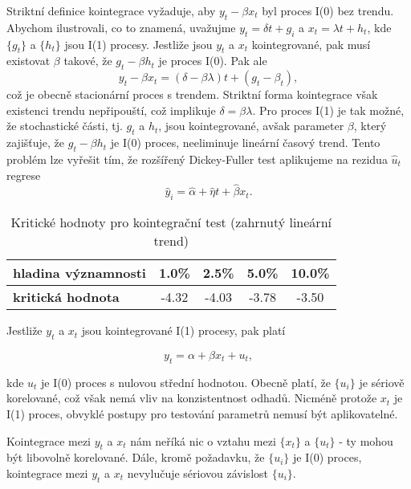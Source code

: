 Striktní definice kointegrace vyžaduje, aby $y_t - \beta x_t$ byl proces I(0) bez trendu. Abychom ilustrovali, co to 
znamená, uvažujme $y_t = \delta t + g_i$ a $x_t = \lambda t + h_t$, kde $\{g_t\}$ a $\{h_t\}$ jsou I(1) procesy. 
Jestliže jsou $y_t$ a $x_t$ kointegrované, pak musí existovat $\beta$ takové, že $g_t - \beta h_t$ je proces I(0). 
Pak ale
\begin{equation}
y_t - \beta x_t = (\delta - \beta \lambda)t + (g_t - \beta_t),
\end{equation}
což je obecně stacionární proces s 
trendem. Striktní forma kointegrace však existenci trendu nepřipouští, což implikuje $\delta = \beta \lambda$. 
Pro proces I(1) je tak možné, že stochastické části, tj. $g_t$ a $h_t$, jsou kointegrované, avšak parameter 
$\beta$, který zajišťuje, že $g_t - \beta h_t$ je I(0) proces, neeliminuje lineární časový trend. Tento 
problém lze vyřešit tím, že rozšířený Dickey-Fuller test aplikujeme na rezidua $\hat{u}_t$ regrese
\begin{equation}
\hat{y}_i = \hat{\alpha} + \hat{\eta} t + \hat{\beta} x_t.
\end{equation}

\begin{table}
\begin{center}
\begin{tabular}{| l | c | c | c | c |}
\hline
\bf{hladina významnosti} & 1.0\% & 2.5\% & 5.0\% & 10.0\%\\
\hline
\bf{kritická hodnota} & -4.32 & -4.03 & -3.78 & -3.50\\
\hline
\end{tabular}
\caption{Kritické hodnoty pro kointegrační test (zahrnutý lineární trend)}
\end{center}
\end{table}

Jestliže $y_t$ a $x_t$ jsou kointegrované I(1) procesy, pak platí

\begin{equation}
y_t = \alpha + \beta x_t + u_t,
\end{equation}

kde $u_t$ je I(0) proces s nulovou střední hodnotou. Obecně platí, že $\{u_i\}$ je sériově korelované, což 
však nemá vliv na konzistentnost odhadů. Nicméně protože $x_t$ je I(1) proces, obvyklé postupy pro testování 
parametrů nemusí být aplikovatelné.

Kointegrace mezi $y_t$ a $x_t$ nám neříká nic o vztahu mezi $\{x_t\}$ a $\{u_t\}$ - ty mohou být libovolně 
korelované. Dále, kromě požadavku, že $\{u_i\}$ je I(0) proces, kointegrace mezi $y_t$ a $x_t$ nevylučuje 
sériovou závislost $\{u_i\}$.


